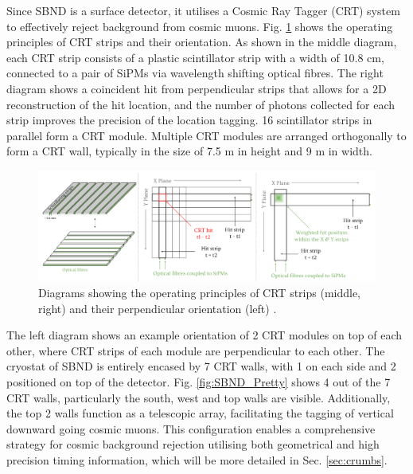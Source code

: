 Since SBND is a surface detector, it utilises a Cosmic Ray Tagger (CRT) system to effectively reject background from cosmic muons.                                                         
Fig. \ref{fig:SBND_CRT} shows the operating principles of CRT strips and their orientation.                                                                                                 
As shown in the middle diagram, each CRT strip consists of a plastic scintillator strip with a width of 10.8 cm, connected to a pair of SiPMs via wavelength shifting optical fibres.       
The right diagram shows a coincident hit from perpendicular strips that allows for a 2D reconstruction of the hit location, and the number of photons collected for each strip improves the precision of the location tagging.
16 scintillator strips in parallel form a CRT module.
Multiple CRT modules are arranged orthogonally to form a CRT wall, typically in the size of 7.5 m in height and 9 m in width.                                                                  
\begin{figure}[b!] 
\centering    
\includegraphics[width=1.0\textwidth]{SBND_CRT}
\caption[Cosmic Ray Tagger Diagrams]{
Diagrams showing the operating principles of CRT strips (middle, right) and their perpendicular orientation (left) \cite{RhiannonPhD}.
}
\label{fig:SBND_CRT}
\end{figure}

The left diagram shows an example orientation of 2 CRT modules on top of each other, where CRT strips of each module are perpendicular to each other.
The cryostat of SBND is entirely encased by 7 CRT walls, with 1 on each side and 2 positioned on top of the detector.
Fig. \ref{fig:SBND_Pretty} shows 4 out of the 7 CRT walls, particularly the south, west and top walls are visible.
Additionally, the top 2 walls function as a telescopic array, facilitating the tagging of vertical downward going cosmic muons.
This configuration enables a comprehensive strategy for cosmic background rejection utilising both geometrical and high precision timing information, which will be more detailed in Sec. \ref{sec:crumbs}.

